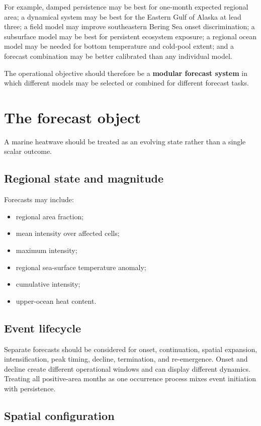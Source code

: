 \documentclass[11pt]{article}
\newcommand{\MHW}{marine heatwave}
\begin{document}
For example, damped persistence may be best for one-month expected regional area; a dynamical system may be best for the Eastern Gulf of Alaska at lead three; a field model may improve southeastern Bering Sea onset discrimination; a subsurface model may be best for persistent ecosystem exposure; a regional ocean model may be needed for bottom temperature and cold-pool extent; and a forecast combination may be better calibrated than any individual model.

The operational objective should therefore be a \textbf{modular forecast system} in which different models may be selected or combined for different forecast tasks.

\section{The forecast object}

A \MHW{} should be treated as an evolving state rather than a single scalar outcome.

\subsection{Regional state and magnitude}

Forecasts may include:

\begin{itemize}
  \item regional area fraction;
  \item mean intensity over affected cells;
  \item maximum intensity;
  \item regional sea-surface temperature anomaly;
  \item cumulative intensity;
  \item upper-ocean heat content.
\end{itemize}

\subsection{Event lifecycle}

Separate forecasts should be considered for onset, continuation, spatial expansion, intensification, peak timing, decline, termination, and re-emergence. Onset and decline create different operational windows and can display different dynamics. Treating all positive-area months as one occurrence process mixes event initiation with persistence.

\subsection{Spatial configuration}
\end{document}
